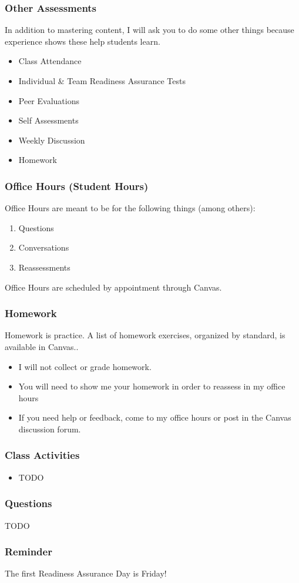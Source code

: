 \documentclass[aspectration=1610]{beamer}
\begin{document}
\begin{frame}\frametitle{Other Assessments}
In addition to mastering content, I will ask you to do some other things because experience shows these help students learn.
\begin{itemize}
\item Class Attendance
\item Individual \& Team Readiness Assurance Tests
\item Peer Evaluations
\item Self Assessments
\item Weekly Discussion
\item Homework
\end{itemize}
\end{frame}


\begin{frame}\frametitle{Office Hours (Student Hours)}
Office Hours are meant to be for the following things (among others):
\begin{enumerate}
\item Questions
\item Conversations
\item Reassessments
\end{enumerate}

\vspace{0.2in}

Office Hours are scheduled by appointment through Canvas.
\end{frame}



\begin{frame}\frametitle{Homework}
Homework is practice.  A list of homework exercises, organized by standard, is available in Canvas..
\begin{itemize}
\item I will not collect or grade homework.
\item You will need to show me your homework in order to reassess in my office hours
\item If you need help or feedback, come to my office hours or post in the Canvas discussion forum.
\end{itemize}
\end{frame}

\begin{frame}\frametitle{Class Activities}
\begin{itemize}
\item TODO
\end{itemize}

\end{frame}

\begin{frame}\frametitle{Questions}
TODO
\end{frame}


\begin{frame}\frametitle{Reminder}
The first Readiness Assurance Day is Friday!
\end{frame}
\end{document}
